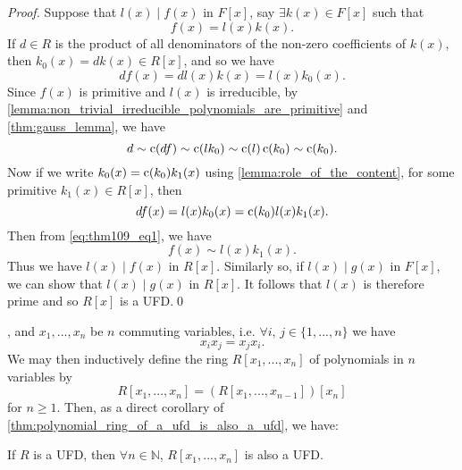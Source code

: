 \begin{proof}
  Suppose that $l(x) \mid f(x)$ in $F[x]$, say $\exists k(x) \in F[x]$ such that
  \begin{equation*}
    f(x) = l(x) k(x).
  \end{equation*}
  If $d \in R$ is the product of all denominators of the non-zero coefficients of $k(x)$, then $k_0(x) = dk(x) \in R[x]$, and so we have
  \begin{equation*}
    df(x) = dl(x) k(x) = l(x) k_0(x).
  \end{equation*}
  Since $f(x)$ is primitive and $l(x)$ is irreducible, by \cref{lemma:non_trivial_irreducible_polynomials_are_primitive} and \cref{thm:gauss_lemma}, we have
  \begin{equation}\label{eq:thm109_eq1}
    d \sim \operatorname{c}(df) \sim \operatorname{c}(lk_0) \sim \operatorname{c}(l) \operatorname{c}(k_0) \sim \operatorname{c}(k_0).
  \end{equation}
  Now if we write $k_0(x) = \operatorname{c}(k_0) k_1(x)$ using \cref{lemma:role_of_the_content}, for some primitive $k_1(x) \in R[x]$, then
  \begin{equation*}
    df(x) = l(x) k_0(x) = \operatorname{c}(k_0) l(x) k_1(x).
  \end{equation*}
  Then from \cref{eq:thm109_eq1}, we have
  \begin{equation*}
    f(x) \sim l(x) k_1(x).
  \end{equation*}
  Thus we have $l(x) \mid f(x)$ in $R[x]$. Similarly so, if $l(x) \mid g(x)$ in $F[x]$, we can show that $l(x) \mid g(x)$ in $R[x]$. It follows that $l(x)$ is therefore prime and so $R[x]$ is a UFD.\qed
\end{proof}

, and $x_1, ..., x_n$ be $n$ commuting variables, i.e. $\forall i, \, j \in \{1, ..., n\}$ we have
\begin{equation*}
  x_i x_j = x_j x_i.
\end{equation*}
We may then inductively define the ring $R[x_1, ..., x_n]$ of polynomials in $n$ variables by
\begin{equation*}
  R[x_1, ..., x_n] = \left( R[x_1, ..., x_{n - 1}] \right)[x_n]
\end{equation*}
for $n \geq 1$. Then, as a direct corollary of \cref{thm:polynomial_ring_of_a_ufd_is_also_a_ufd}, we have:

\begin{crly}
\label{crly:multiparametered_polynomial_ring_of_a_ufd_is_also_a_ufd}
If $R$ is a UFD, then $\forall n \in \mathbb{N}$, $R[x_1, ..., x_n]$ is also a UFD.
\end{crly}

